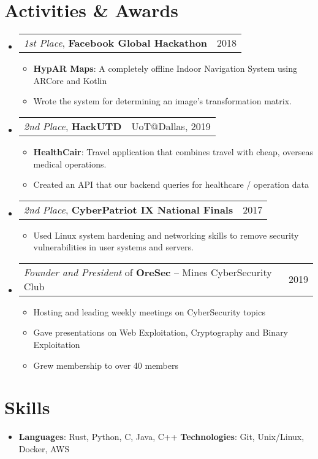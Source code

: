 \documentclass[letterpaper,11pt]{article}
\makeatletter
\newcommand{\resumeItem}[1]{
  \item\small{
    {#1 \vspace{-2pt}}
  }
}
\newcommand{\awardSubheading}[2]{
  \vspace{-1pt}\item
    \begin{tabular*}{0.97\textwidth}[t]{l@{\extracolsep{\fill}}r}
      \small #1 & \small #2 \\
    \end{tabular*}\vspace{-8pt}
}
\newcommand{\resumeSubHeadingListStart}{\begin{itemize}[leftmargin=*]}
\newcommand{\resumeSubHeadingListEnd}{\end{itemize}}
\newcommand{\resumeItemListStart}{\begin{itemize}}
\newcommand{\resumeItemListEnd}{\end{itemize}\vspace{-10pt}}
\makeatother
\begin{document}
\section{Activities \& Awards}
  \resumeSubHeadingListStart
    \awardSubheading
      {\textit{1st Place}, \textbf{Facebook Global Hackathon}}{2018}
      \resumeItemListStart
        \resumeItem
          {\textbf{HypAR Maps}: A completely offline Indoor Navigation System using ARCore and Kotlin}
        \resumeItem
          {Wrote the system for determining an image’s transformation matrix.}
      \resumeItemListEnd
    \awardSubheading
      {\textit{2nd Place}, \textbf{HackUTD}}{UoT@Dallas, 2019}
      \resumeItemListStart
        \resumeItem
          {\textbf{HealthCair}: Travel application that combines travel with cheap, overseas medical operations.}
        \resumeItem
          {Created an API that our backend queries for healthcare / operation data}
      \resumeItemListEnd
    \awardSubheading
      {\textit{2nd Place}, \textbf{CyberPatriot IX National Finals}}{2017}
      \resumeItemListStart
        \resumeItem
          {Used Linux system hardening and networking skills to remove security vulnerabilities in user systems and servers.}
      \resumeItemListEnd
    \awardSubheading
    {\textit{Founder and President} of \textbf{OreSec} -- Mines CyberSecurity Club}{2019}
    \resumeItemListStart
      \resumeItem
        {Hosting and leading weekly meetings on CyberSecurity topics}
      \resumeItem
        {Gave presentations on Web Exploitation, Cryptography and Binary Exploitation}
      \resumeItem
        {Grew membership to over 40 members}
    \resumeItemListEnd
  \resumeSubHeadingListEnd
\vspace{-15pt} %

\section{Skills}
  \resumeSubHeadingListStart
    \item{
      \textbf{Languages}{: Rust, Python, C, Java, C++}
      \hfill
      \textbf{Technologies}{: Git, Unix/Linux, Docker, AWS}
    }
    \vspace{-10pt}
    
  \resumeSubHeadingListEnd


%


\end{document}
